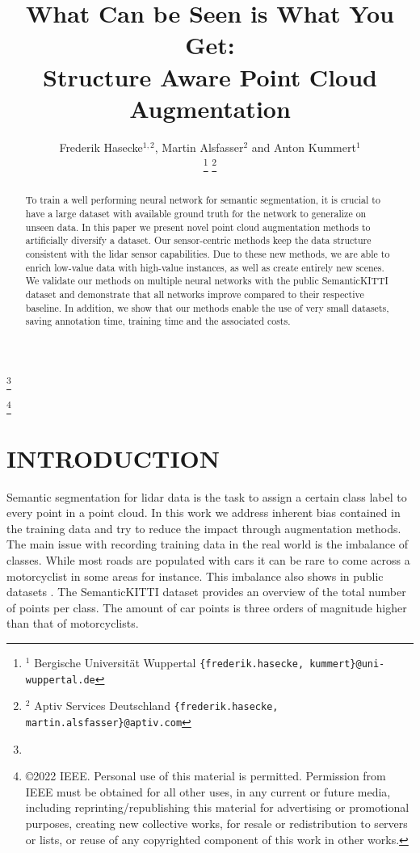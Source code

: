 \documentclass[letterpaper, 10 pt, conference]{ieeeconf}
\title{\LARGE \bf
What Can be Seen is What You Get:\\Structure Aware Point Cloud Augmentation
}
\author{
	Frederik Hasecke$^{1,2}$,  Martin Alsfasser$^2$ and Anton Kummert$^1$
	
\thanks{$^{1}$ Bergische Universit\"at Wuppertal
        {\tt\small \{frederik.hasecke, kummert\}@uni-wuppertal.de}}
\thanks{$^{2}$ Aptiv Services Deutschland
        {\tt\small \{frederik.hasecke, martin.alsfasser\}@aptiv.com}}}
\newcommand\blfootnote[1]{\begingroup
	\renewcommand\thefootnote{}\footnote{#1}\addtocounter{footnote}{-1}\endgroup
}
\begin{document}
\maketitle
\thispagestyle{empty}
\pagestyle{empty}


\begin{abstract}
To train a well performing neural network for semantic segmentation, it is crucial to have a large dataset with available ground truth for the network to generalize on unseen data.
	In this paper we present novel point cloud augmentation methods to artificially diversify a dataset.
	Our sensor-centric methods keep the data structure consistent with the lidar sensor capabilities. Due to these new methods, we are able to enrich low-value data with high-value instances, as well as create entirely new scenes.
	We validate our methods on multiple neural networks with the public SemanticKITTI \cite{behley2019semantickitti} dataset and demonstrate that all networks improve compared to their respective baseline. 
	In addition, we show that our methods enable the use of very small datasets, saving annotation time, training time and the associated costs.
	
	
\end{abstract}




\blfootnote{}
\blfootnote{\copyright 2022 IEEE. Personal use of this material is permitted. Permission from IEEE must be obtained for all other uses, in any current or future media, including reprinting/republishing this material for advertising or promotional purposes, creating new collective works, for resale or redistribution to servers or lists, or reuse of any copyrighted component of this work in other works.}
\section{INTRODUCTION}
\label{section:intro}
Semantic segmentation for lidar data is the task to assign a certain class label to every point in a point cloud. 
In this work we address inherent bias contained in the training data and try to reduce the impact through augmentation methods.
The main issue with recording training data in the real world is the imbalance of classes. While most roads are populated with cars it can be rare to come across a motorcyclist in some areas for instance. This imbalance also shows in public datasets \cite{behley2019semantickitti}\cite{caesar2020nuscenes}. The SemanticKITTI \cite{behley2019semantickitti} dataset provides an overview of the total number of points per class. The amount of car points is three orders of magnitude higher than that of motorcyclists. 
\end{document}
